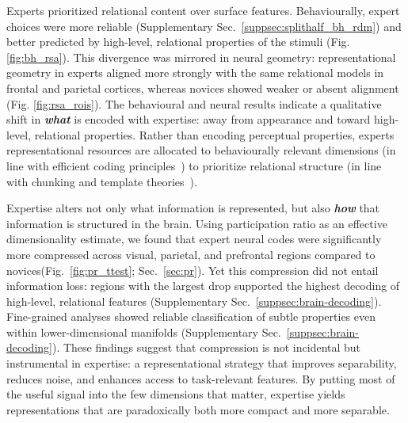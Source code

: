 \documentclass[preprint,12pt]{elsarticle}
\begin{document}
Experts prioritized relational content over surface features. Behaviourally, expert choices were more reliable (Supplementary Sec.~\ref{suppsec:splithalf_bh_rdm}) and better predicted by high-level, relational properties of the stimuli (Fig. \ref{fig:bh_rsa}). This divergence was mirrored in neural geometry: representational geometry in experts aligned more strongly with the same relational models in frontal and parietal cortices, whereas novices showed weaker or absent alignment (Fig. \ref{fig:rsa_rois}). The behavioural and neural results indicate a qualitative shift in \textbf{\emph{what}} is encoded with expertise: away from appearance and toward high-level, relational properties. Rather than encoding perceptual properties, experts representational resources are allocated to behaviourally relevant dimensions (in line with efficient coding principles~\cite{barlow1961possible}) to prioritize relational structure (in line with chunking and template theories~\cite{Chase1973,gobet1996templates}).

Expertise alters not only what information is represented, but also \textbf{\emph{how}} that information is structured in the brain. Using participation ratio as an effective dimensionality estimate, we found that expert neural codes were significantly more compressed across visual, parietal, and prefrontal regions compared to novices(Fig.~\ref{fig:pr_ttest}; Sec.~\ref{sec:pr}). Yet this compression did not entail information loss: regions with the largest drop supported the highest decoding of high-level, relational features (Supplementary Sec.~\ref{suppsec:brain-decoding}). Fine-grained analyses showed reliable classification of subtle properties even within lower-dimensional manifolds (Supplementary Sec.~\ref{suppsec:brain-decoding}). These findings suggest that compression is not incidental but instrumental in expertise: a representational strategy that improves separability, reduces noise, and enhances access to task-relevant features. By putting most of the useful signal into the few dimensions that matter, expertise yields representations that are paradoxically both more compact and more separable.
\end{document}
